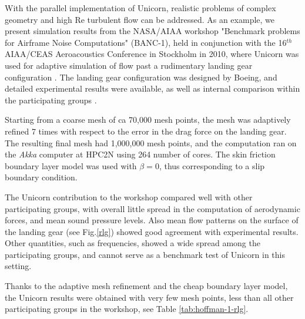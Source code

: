 With the parallel implementation of Unicorn, realistic problems of complex geometry and high Re turbulent flow can be addressed. As an example, we present simulation results from the NASA/AIAA workshop "Benchmark problems for Airframe Noise Computations" (BANC-1), held in conjunction with the 16$^{th}$ AIAA/CEAS Aeroacoustics Conference in Stockholm in 2010, where Unicorn was used for adaptive simulation of flow past a rudimentary landing gear configuration \cite{VilelaJanssonEtAl2010}. The landing gear configuration was designed by Boeing, and detailed experimental results were available, as well as internal comparison within the participating groups \cite{SpalartMejia2011}.

Starting from a coarse mesh of ca 70,000 mesh points, the mesh was adaptively refined 7 times with respect to the error in the drag force on the landing gear. The resulting final mesh had 1,000,000 mesh points, and the computation ran on the \textit{Akka} computer at HPC2N using 264 number of cores. The skin friction boundary layer model was used with $\beta=0$, thus corresponding to a slip boundary condition.

The Unicorn contribution to the workshop compared well with other participating groups, with overall little spread in the computation of aerodynamic forces, and mean sound pressure levels. Also mean flow patterns on the surface of the landing gear (see Fig.\ref{rlg}) showed good agreement with experimental results. Other quantities, such as frequencies, showed a wide spread among the participating groups, and cannot serve as a benchmark test of Unicorn in this setting.

Thanks to the adaptive mesh refinement and the cheap boundary layer model, the Unicorn results were obtained with very few mesh points, less than all other participating groups in the workshop, see Table \ref{tab:hoffman-1-rlg}.


